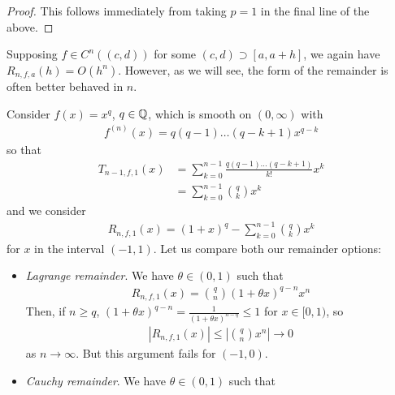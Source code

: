 \documentclass{../../template/note}
\begin{document}
    \begin{proof}
        This follows immediately from taking \(p=1\) in the final line of the above.
    \end{proof}
    
    
    \begin{remark*}
        Supposing \(f \in C^n((c, d))\) for some \((c, d) \supset [a, a+h]\), we again have \(R_{n,f,a}(h) = O(h^n)\). However, as we will see, the form of the remainder is often better behaved in \(n\).
    \end{remark*}
    
    \begin{example*}
        Consider \(f(x) = x^q\), \(q \in \mathbb Q\), which is smooth on \((0, \infty)\) with
        \begin{align*}
            f^{(n)}(x) = q (q-1) \dots (q-k+1) x^{q-k}
        \end{align*}
        so that
        \begin{align*}
            T_{n-1,f,1}(x) &= \sum_{k=0}^{n-1} \frac{q(q-1) \dots (q-k+1)}{k!}x^k \\
            &= \sum_{k=0}^{n-1} \binom q k x^k
        \end{align*}
        and we consider
        \begin{align*}
            R_{n,f,1}(x) = (1+x)^q - \sum_{k=0}^{n-1} \binom q k x^k
        \end{align*}
        for \(x\) in the interval \((-1, 1)\). Let us compare both our remainder options:
        \begin{itemize}
            \item \emph{Lagrange remainder}. We have \(\theta \in (0, 1)\) such that
            \begin{align*}
                R_{n,f,1}(x) = \binom q n (1+\theta x)^{q-n}x^n
            \end{align*}
            Then, if \(n \geq q\), \((1+\theta x)^{q-n} = \frac 1{(1+\theta x)^{n-q}} \leq 1\) for \(x \in [0, 1)\), so
            \begin{align*}
                |R_{n,f,1}(x)| \leq \left|\binom q n x^n\right| \to 0
            \end{align*}
            as \(n \to \infty\). But this argument fails for \((-1, 0)\).
            \item \emph{Cauchy remainder}. We have \(\theta \in (0, 1)\) such that
            \begin{align*}

\end{align*}
\end{itemize}
\end{example*}
\end{document}
